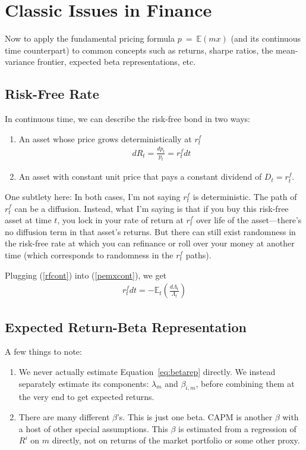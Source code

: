 \documentclass[12pt]{article}
\theoremstyle{plain}
\theoremstyle{definition}
\theoremstyle{remark}
\begin{document}
\newpage
\section{Classic Issues in Finance}

Now to apply the fundamental pricing formula $p~=~\mathbb{E}(mx)$ (and
its continuous time counterpart) to common concepts such as returns,
sharpe ratios, the mean-variance frontier, expected beta
representations, etc.

\subsection{Risk-Free Rate}

In continuous time, we can describe the risk-free bond in two ways:
\begin{enumerate}
  \item An asset whose price grows deterministically at $r_t^f$
    \begin{align}
      dR_t = \frac{dp_t}{p_t} = r^f_t dt
      \label{rfcont}
    \end{align}

  \item An asset with constant unit price that pays a constant dividend
    of $D_t=r^f_t$.
\end{enumerate}
One subtlety here: In both cases, I'm not saying $r^f_t$ is
deterministic. The path of $r^f_t$ can be a diffusion. Instead, what I'm
saying is that if you buy this risk-free asset at time $t$, you lock in
your rate of return at $r^f_t$ over life of the asset---there's no
diffusion term in that asset's returns. But there can still exist
randomness in the risk-free rate at which you can refinance or roll over
your money at another time (which corresponds to randomness in the
$r^f_t$ paths).

Plugging (\ref{rfcont}) into (\ref{pemxcont}), we get
\begin{align}
  r^f_t dt = -\mathbb{E}_t\left(\frac{d\Lambda_t}{\Lambda_t}\right)
\end{align}


\subsection{Expected Return-Beta Representation}

A few things to note:
\begin{enumerate}
  \item We never actually estimate Equation~\ref{eq:betarep} directly.
    We instead separately estimate its components: $\lambda_m$ and
    $\beta_{i,m}$, before combining them at the very end to get
    expected returns.
  \item There are many different $\beta$'s. This is just one beta. CAPM
    is another $\beta$ with a host of other special assumptions. This
    $\beta$ is estimated from a regression of $R^i$ on $m$ directly, not
    on returns of the market portfolio or some other proxy.
\end{enumerate}
\end{document}
